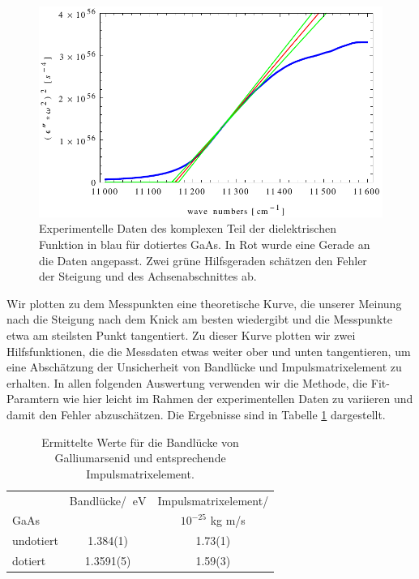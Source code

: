 \documentclass[paper=a4,fontsize=10pt,DIV=18,twocolumn,parskip=half]{scrartcl}
\numberwithin{equation}{section}    %
\begin{document}
\begin{figure}
	\begin{center}
		\includegraphics[width=\columnwidth]{Bilder/bl_undot}
		\caption{Experimentelle Daten des komplexen Teil der dielektrischen Funktion in blau für dotiertes GaAs. In Rot wurde eine Gerade an die Daten angepasst. Zwei grüne Hilfsgeraden schätzen den Fehler der Steigung und des Achsenabschnittes ab.}
		\label{bl_undot}
	\end{center}
\end{figure}

Wir plotten zu dem Messpunkten eine theoretische Kurve, die unserer Meinung nach 
die Steigung nach dem Knick am besten wiedergibt und die Messpunkte etwa am 
steilsten Punkt tangentiert. Zu dieser Kurve plotten wir zwei Hilfsfunktionen, 
die die Messdaten etwas weiter ober und unten tangentieren, um eine Abschätzung 
der Unsicherheit von Bandlücke und Impulsmatrixelement zu erhalten. In allen 
folgenden Auswertung verwenden wir die Methode, die Fit-Paramtern wie hier leicht im Rahmen der experimentellen Daten zu variieren und damit den Fehler abzuschätzen.
Die Ergebnisse sind in Tabelle \ref{ime} dargestellt.




\begin{table}
    \begin{center}
\begin{tabular}[r]{ l | c c }
            &Bandlücke/ $\SI{}{\eV}	$		&Impulsmatrixelement/\\
  GaAs &  & $10^{-25}$ kg m/s\\
  \hline
  undotiert & 1.384(1) & 1.73(1) \\
 dotiert & 1.3591(5) & 1.59(3)   \end{tabular}
\caption{Ermittelte Werte für die Bandlücke von Galliumarsenid und entsprechende 
Impulsmatrixelement.}
  \label{ime}  \end{center}
\end{table}
\end{document}
